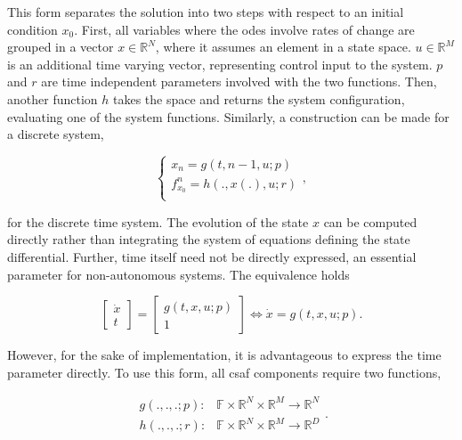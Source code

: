 This form separates the solution into two steps with respect to an initial condition $x_0$. First, all variables 
where the \acrshort{ode}s involve rates of change are grouped in a vector $x \in \mathbb R^N$, where it 
assumes an element in a state space. $u \in \mathbb R^M$ is an additional time varying vector, representing 
control input to the system. $p$ and $r$ are time independent parameters involved with the two functions. 
Then, another function $h$ takes the space and returns the system configuration, evaluating one of the 
system functions. Similarly, a construction can be made for a discrete system,

\begin{equation}
\begin{cases}
x_{n} = g(t, n-1, u; p)\\
f^{n}_{x_0} = h(., x(.), u; r) \\
\end{cases},
\end{equation}

for the discrete time system. The evolution of the state $x$ can be computed directly rather than integrating 
the system of equations defining the state differential. Further, time itself need not be directly expressed, an 
essential parameter for non-autonomous systems. The equivalence holds

\begin{equation} \label{equ:cequ}
\begin{bmatrix}
\dot x \\
t
\end{bmatrix} = 
\begin{bmatrix}
g(t, x, u; p) \\
1
\end{bmatrix} \iff \dot x = g(t, x, u;p) .
\end{equation}

However, for the sake of implementation, it is advantageous to express the time parameter directly. To use 
this form, all \acrshort{csaf}  components require two functions, 

\begin{equation} \label{equ:dequ}
\begin{aligned}
g(.,.,.;p):& \mathbb F \times \mathbb R^N \times \mathbb R^M \rightarrow \mathbb R^N \\
h(.,.,.;r):& \mathbb F \times \mathbb R^N \times \mathbb R^M \rightarrow \mathbb R^D
\end{aligned}.
\end{equation}

